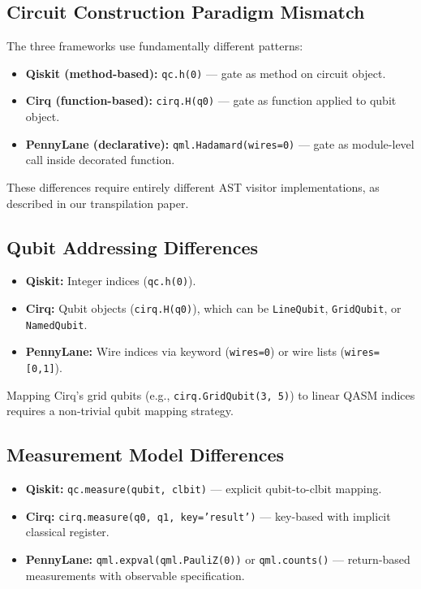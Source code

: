 \documentclass[journal]{IEEEtran}
\begin{document}
\subsection{Circuit Construction Paradigm Mismatch}

The three frameworks use fundamentally different patterns:

\begin{itemize}
    \item \textbf{Qiskit (method-based):} \texttt{qc.h(0)} --- gate as method on circuit object.
    \item \textbf{Cirq (function-based):} \texttt{cirq.H(q0)} --- gate as function applied to qubit object.
    \item \textbf{PennyLane (declarative):} \texttt{qml.Hadamard(wires=0)} --- gate as module-level call inside decorated function.
\end{itemize}

These differences require entirely different AST visitor implementations, as described in our transpilation paper.

\subsection{Qubit Addressing Differences}

\begin{itemize}
    \item \textbf{Qiskit:} Integer indices (\texttt{qc.h(0)}).
    \item \textbf{Cirq:} Qubit objects (\texttt{cirq.H(q0)}), which can be \texttt{LineQubit}, \texttt{GridQubit}, or \texttt{NamedQubit}.
    \item \textbf{PennyLane:} Wire indices via keyword (\texttt{wires=0}) or wire lists (\texttt{wires=[0,1]}).
\end{itemize}

Mapping Cirq's grid qubits (e.g., \texttt{cirq.GridQubit(3, 5)}) to linear QASM indices requires a non-trivial qubit mapping strategy.

\subsection{Measurement Model Differences}

\begin{itemize}
    \item \textbf{Qiskit:} \texttt{qc.measure(qubit, clbit)} --- explicit qubit-to-clbit mapping.
    \item \textbf{Cirq:} \texttt{cirq.measure(q0, q1, key='result')} --- key-based with implicit classical register.
    \item \textbf{PennyLane:} \texttt{qml.expval(qml.PauliZ(0))} or \texttt{qml.counts()} --- return-based measurements with observable specification.
\end{itemize}
\end{document}
